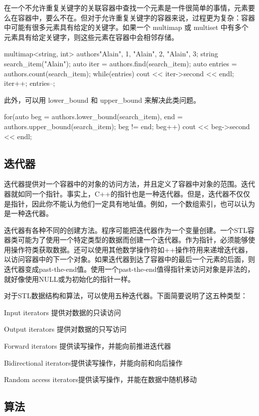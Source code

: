 \begin{enumerate}
在一个不允许重复关键字的关联容器中查找一个元素是一件很简单的事情，元素要么在容器中，要么不在。但对于允许重复关键字的容器来说，过程更为复杂：容器中可能有很多元素具有给定的关键字。如果一个 multimap 或 multiset 中有多个元素具有给定关键字，则这些元素在容器中会相邻存储。
\begin{Code}
multimap<string, int> authors{{"Alain", 1}, {"Alain", 2}, {"Alain", 3}};
string search_item("Alain");
auto iter = authors.find(search_item);
auto entries = authors.count(search_item);
while(entries){
	cout << iter->second << endl;
	iter++;
	entries--;
}
\end{Code}
此外，可以用 lower_bound 和 upper_bound 来解决此类问题。 
\begin{Code}
for(auto beg = authors.lower_bound(search_item), end = authors.upper_bound(search_item);
beg != end; beg++){
	cout << beg->second << endl;
}
\end{Code}
\end{enumerate}

\subsection {迭代器}

迭代器提供对一个容器中的对象的访问方法，并且定义了容器中对象的范围。迭代器就如同一个指针。事实上，C++的指针也是一种迭代器。但是，迭代器不仅仅是指针，因此你不能认为他们一定具有地址值。例如，一个数组索引，也可以认为是一种迭代器。

迭代器有各种不同的创建方法。程序可能把迭代器作为一个变量创建。一个STL容器类可能为了使用一个特定类型的数据而创建一个迭代器。作为指针，必须能够使用操作符类获取数据。还可以使用其他数学操作符如++操作符用来递增迭代器，以访问容器中的下一个对象。如果迭代器到达了容器中的最后一个元素的后面，则迭代器变成past-the-end值。使用一个past-the-end值得指针来访问对象是非法的，就好像使用NULL或为初始化的指针一样。

对于STL数据结构和算法，可以使用五种迭代器。下面简要说明了这五种类型：

 Input iterators 提供对数据的只读访问
 
 Output iterators 提供对数据的只写访问
 
 Forward iterators 提供读写操作，并能向前推进迭代器
 
 Bidirectional iterators提供读写操作，并能向前和向后操作
 
 Random access iterators提供读写操作，并能在数据中随机移动


\subsection {算法}

